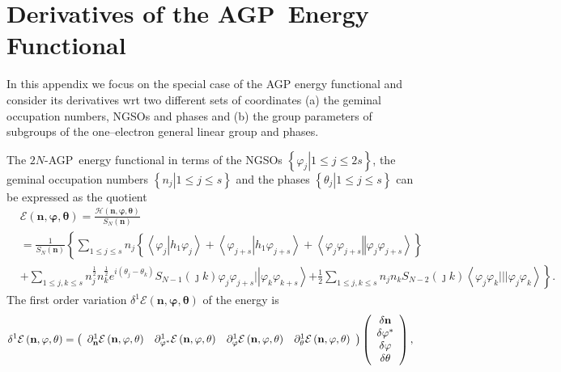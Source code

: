 \documentclass[aps,preprint]{revtex4}%
\begin{document}
\section{Derivatives of the AGP\ Energy Functional\label{variational}}

In this appendix we focus on the special case of the AGP energy functional and
consider its derivatives wrt two different sets of coordinates (a) the geminal
occupation numbers, NGSOs and phases and (b) the group parameters of subgroups
of the one--electron general linear group and phases.

The $2N$-AGP\ energy functional in terms of the NGSOs $\left\{  \left.
\varphi_{j}\right\vert 1\leq j\leq2s\right\}  $, the geminal occupation
numbers $\left\{  \left.  n_{j}\right\vert 1\leq j\leq s\right\}  $ and the
phases $\left\{  \left.  \theta_{j}\right\vert 1\leq j\leq s\right\}  $ can be
expressed as the quotient%
\begin{align}
&  \mathcal{E}\left(  \mathbf{n},\mathbf{\varphi},\mathbf{\theta}\right)
=\frac{\mathcal{H}\left(  \mathbf{n},\mathbf{\varphi},\mathbf{\theta}\right)
}{S_{N}\left(  \mathbf{n}\right)  }\nonumber\\
&  =\frac{1}{S_{N}\left(  \mathbf{n}\right)  }\left\{  \sum_{1\leq j\leq
s}n_{j}\left\{  \left\langle \varphi_{j}\left\vert h_{1}\varphi_{j}\right.
\right\rangle +\left\langle \varphi_{j+s}\left\vert h_{1}\varphi_{j+s}\right.
\right\rangle +\left\langle \varphi_{j}\varphi_{j+s}\left\Vert \varphi
_{j}\varphi_{j+s}\right.  \right\rangle \right\}  \right. \nonumber\\
&  +\sum_{1\leq j,k\leq s}n_{j}^{\frac{1}{2}}n_{k}^{\frac{1}{2}}e^{i\left(
\theta_{j}-\theta_{k}\right)  }S_{N-1}\left(  \jmath k\right)  \varphi
_{j}\varphi_{j+s}|\left\vert \varphi_{k}\varphi_{k+s}\right\rangle \left.
+\frac{1}{2}\sum_{1\leq j,k\leq s}n_{j}n_{k}S_{N-2}\left(  \jmath k\right)
\left\langle \varphi_{j}\varphi_{k}|||\varphi_{j}\varphi_{k}\right\rangle
\right\}  .
\end{align}
The first order variation $\delta^{1}\mathcal{E}\left(  \mathbf{n}%
,\mathbf{\varphi},\mathbf{\theta}\right)  $ of the energy is
\begin{equation}
\delta^{1}\mathcal{E}\left(  \mathbf{n},\mathbf{\varphi},\mathbf{\theta
}\right)  =\left(
\begin{array}
[c]{cccc}%
\partial_{\mathbf{n}}^{1}\mathcal{E}\left(  \mathbf{n},\mathbf{\varphi
},\mathbf{\theta}\right)  & \partial_{\mathbf{\varphi}^{\ast}}^{1}%
\mathcal{E}\left(  \mathbf{n},\mathbf{\varphi},\mathbf{\theta}\right)  &
\partial_{\mathbf{\varphi}}^{1}\mathcal{E}\left(  \mathbf{n},\mathbf{\varphi
},\mathbf{\theta}\right)  & \partial_{\mathbf{\theta}}^{1}\mathcal{E}\left(
\mathbf{n},\mathbf{\varphi},\mathbf{\theta}\right)
\end{array}
\right)  \left(
\begin{array}
[c]{c}%
\delta\mathbf{n}\\
\delta\mathbf{\varphi}^{\ast}\\
\delta\mathbf{\varphi}\\
\delta\mathbf{\theta}%
\end{array}
\right)  ,
\end{equation}
\end{document}
